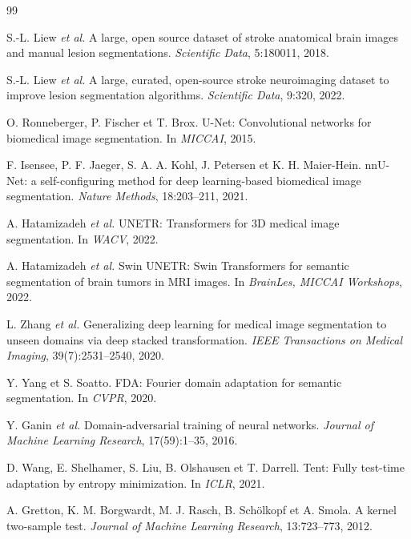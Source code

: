 \documentclass[11pt,a4paper]{report}
\begin{document}
\begin{thebibliography}{99}

S.-L. Liew \emph{et al.}
\newblock A large, open source dataset of stroke anatomical brain images and
manual lesion segmentations.
\newblock \emph{Scientific Data}, 5:180011, 2018.

S.-L. Liew \emph{et al.}
\newblock A large, curated, open-source stroke neuroimaging dataset to improve
lesion segmentation algorithms.
\newblock \emph{Scientific Data}, 9:320, 2022.

O. Ronneberger, P. Fischer et T. Brox.
\newblock U-Net: Convolutional networks for biomedical image segmentation.
\newblock In \emph{MICCAI}, 2015.

F. Isensee, P. F. Jaeger, S. A. A. Kohl, J. Petersen et K. H. Maier-Hein.
\newblock nnU-Net: a self-configuring method for deep learning-based
biomedical image segmentation.
\newblock \emph{Nature Methods}, 18:203--211, 2021.

A. Hatamizadeh \emph{et al.}
\newblock UNETR: Transformers for 3D medical image segmentation.
\newblock In \emph{WACV}, 2022.

A. Hatamizadeh \emph{et al.}
\newblock Swin UNETR: Swin Transformers for semantic segmentation of brain
tumors in MRI images.
\newblock In \emph{BrainLes, MICCAI Workshops}, 2022.

L. Zhang \emph{et al.}
\newblock Generalizing deep learning for medical image segmentation to unseen
domains via deep stacked transformation.
\newblock \emph{IEEE Transactions on Medical Imaging}, 39(7):2531--2540, 2020.

Y. Yang et S. Soatto.
\newblock FDA: Fourier domain adaptation for semantic segmentation.
\newblock In \emph{CVPR}, 2020.

Y. Ganin \emph{et al.}
\newblock Domain-adversarial training of neural networks.
\newblock \emph{Journal of Machine Learning Research}, 17(59):1--35, 2016.

D. Wang, E. Shelhamer, S. Liu, B. Olshausen et T. Darrell.
\newblock Tent: Fully test-time adaptation by entropy minimization.
\newblock In \emph{ICLR}, 2021.

A. Gretton, K. M. Borgwardt, M. J. Rasch, B. Schölkopf et A. Smola.
\newblock A kernel two-sample test.
\newblock \emph{Journal of Machine Learning Research}, 13:723--773, 2012.

\end{thebibliography}
\end{document}
